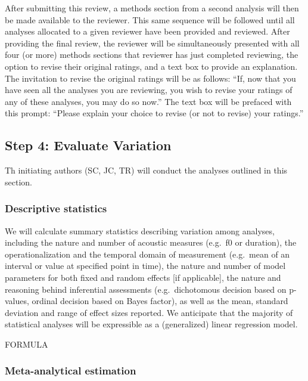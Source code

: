 \documentclass[
  english,
  man,floatsintext]{apa6}
\begin{document}
After submitting this review, a methods section from a second analysis will then be made available to the reviewer.
This same sequence will be followed until all analyses allocated to a given reviewer have been provided and reviewed.
After providing the final review, the reviewer will be simultaneously presented with all four (or more) methods sections that reviewer has just completed reviewing, the option to revise their original ratings, and a text box to provide an explanation.
The invitation to revise the original ratings will be as follows: \enquote{If, now that you have seen all the analyses you are reviewing, you wish to revise your ratings of any of these analyses, you may do so now.}
The text box will be prefaced with this prompt: \enquote{Please explain your choice to revise (or not to revise) your ratings.}

\hypertarget{step-4-evaluate-variation}{%
\subsection{Step 4: Evaluate Variation}\label{step-4-evaluate-variation}}

Th initiating authors (SC, JC, TR) will conduct the analyses outlined in this section.

\hypertarget{descriptive-statistics}{%
\subsubsection{Descriptive statistics}\label{descriptive-statistics}}

We will calculate summary statistics describing variation among analyses, including the nature and number of acoustic measures (e.g.~f0 or duration), the operationalization and the temporal domain of measurement (e.g.~mean of an interval or value at specified point in time), the nature and number of model parameters for both fixed and random effects {[}if applicable{]}, the nature and reasoning behind inferential assessments (e.g.~dichotomous decision based on p-values, ordinal decision based on Bayes factor), as well as the mean, standard deviation and range of effect sizes reported.
We anticipate that the majority of statistical analyses will be expressible as a (generalized) linear regression model.

FORMULA

\hypertarget{s:meta-est}{%
\subsubsection{Meta-analytical estimation}\label{s:meta-est}}
\end{document}
